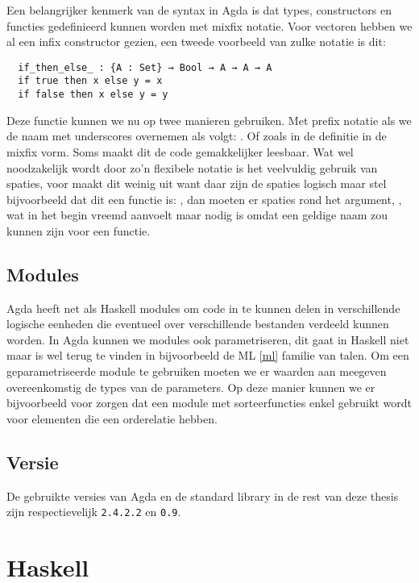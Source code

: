 Een belangrijker kenmerk van de syntax in Agda is dat types, constructors en
functies gedefinieerd kunnen worden met mixfix notatie. Voor vectoren hebben we
al een infix constructor gezien, een tweede voorbeeld van zulke notatie is dit:

\begin{verbatim}
  if_then_else_ : {A : Set} → Bool → A → A → A
  if true then x else y = x
  if false then x else y = y
\end{verbatim}

Deze functie kunnen we nu op twee manieren gebruiken. Met prefix notatie als we
de naam met underscores overnemen als volgt: . Of
zoals in de definitie in de mixfix vorm. Soms maakt dit de code gemakkelijker
leesbaar. Wat wel noodzakelijk wordt door zo'n flexibele notatie is het
veelvuldig gebruik van spaties, voor  maakt dit weinig uit
want daar zijn de spaties logisch maar stel bijvoorbeeld dat dit een functie
is: \iagda{[_]}, dan moeten er spaties rond het argument, \iagda{[ x ]}, wat in
het begin vreemd aanvoelt maar nodig is omdat \iagda{[x]} een geldige naam zou
kunnen zijn voor een functie.

\subsection{Modules}

Agda heeft net als Haskell modules om code in te kunnen delen in verschillende
logische eenheden die eventueel over verschillende bestanden verdeeld kunnen
worden. In Agda kunnen we modules ook parametriseren, dit gaat in Haskell niet
maar is wel terug te vinden in bijvoorbeeld de ML \ref{ml} familie van talen.
Om een geparametriseerde module te gebruiken moeten we er waarden aan meegeven
overeenkomstig de types van de parameters. Op deze manier kunnen we er
bijvoorbeeld voor zorgen dat een module met sorteerfuncties enkel gebruikt
wordt voor elementen die een orderelatie hebben.

\subsection{Versie}

De gebruikte versies van Agda en de standard library in de rest van deze thesis
zijn respectievelijk \texttt{2.4.2.2} en \texttt{0.9}.


\section{Haskell}

